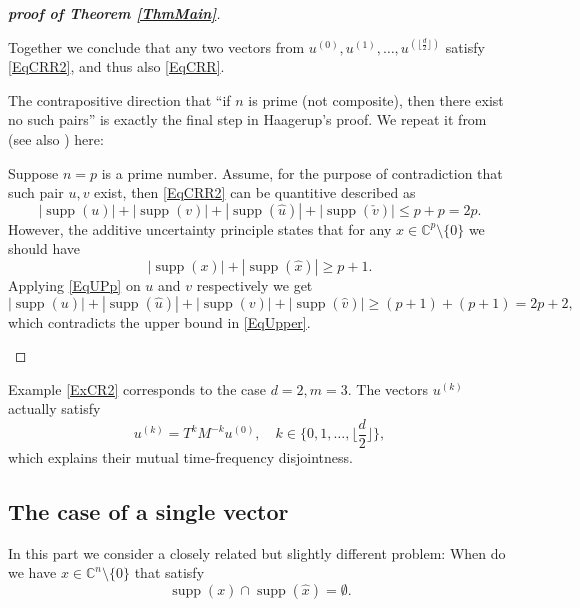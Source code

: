 \documentclass[A4,11pt]{article}
\DeclareMathOperator{\supp}{supp}
\begin{document}
\begin{proof}[\textbf{proof of Theorem \ref{ThmMain}}]
\begin{description}[leftmargin=*]
Together we conclude that any two vectors from $u^{(0)}, u^{(1)}, \ldots, u^{(\lfloor\frac{d}{2}\rfloor)}$ satisfy \eqref{EqCRR2}, and thus also \eqref{EqCRR}.

\item[The only if part:] The contrapositive direction that ``if $n$ is prime (not composite), then there exist no such pairs'' is exactly the final step in Haagerup's proof. We repeat it from \cite[Theorem 3.5]{haagerup2008} (see also \cite[Theorem 5.6]{benedetto2019}) here:

Suppose $n=p$ is a prime number. Assume, for the purpose of contradiction that such pair $u,v$ exist, then \eqref{EqCRR2} can be quantitive described as
\begin{equation} \label{EqUpper}
|\supp(u)|+|\supp(v)|+|\supp(\hat u)|+|\supp(\check v)|\le p+p=2p.
\end{equation}
However, the additive uncertainty principle \cite{tao2005} states that for any $x\in\mathbb C^p\setminus\{0\}$ we should have
\begin{equation} \label{EqUPp}
|\supp(x)|+|\supp(\hat x)|\ge p+1.
\end{equation} 
Applying \eqref{EqUPp} on $u$ and $v$ respectively we get
$$|\supp(u)|+|\supp(\hat u)|+|\supp(v)|+|\supp(\hat v)|\ge (p+1)+(p+1)=2p+2,$$
which contradicts the upper bound in \eqref{EqUpper}. 
\end{description}
\end{proof}

Example \ref{ExCR2} corresponds to the case $d=2, m=3$. The vectors $u^{(k)}$ actually satisfy
$$u^{(k)}=T^kM^{-k}u^{(0)}, \quad k\in\{0,1,\ldots,\lfloor\frac{d}{2}\rfloor\},$$
which explains their mutual time-frequency disjointness.

\subsection{The case of a single vector}
In this part we consider a closely related but slightly different problem: When do we have $x\in\mathbb C^n\setminus\{0\}$ that satisfy
\begin{equation} \label{EqCRR3}
\supp(x)\cap\supp(\hat x)=\emptyset.
\end{equation} 
\end{document}
